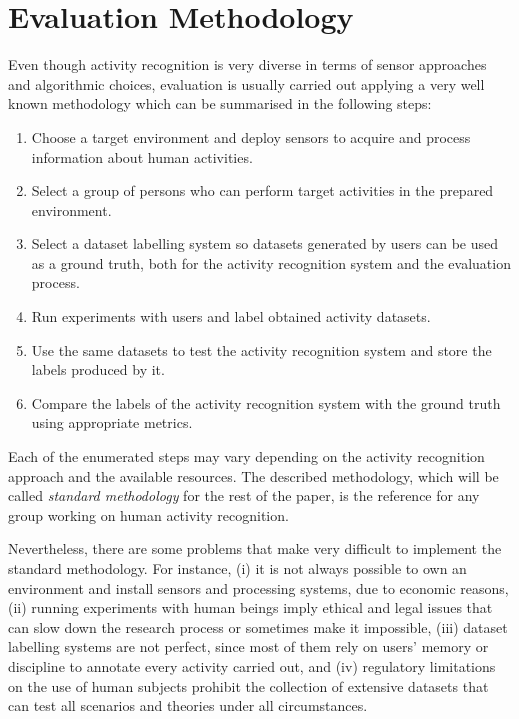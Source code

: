 \section{Evaluation Methodology}
\label{sec:evaluation:methodology}

Even though activity recognition is very diverse in terms of sensor approaches and algorithmic choices, evaluation is usually carried out applying a very well known methodology which can be summarised in the following steps:

\begin{enumerate}
 \item Choose a target environment and deploy sensors to acquire and process information about human activities. 
 \item Select a group of persons who can perform target activities in the prepared environment.
 \item Select a dataset labelling system so datasets generated by users can be used as a ground truth, both for the activity recognition system and the evaluation process.
 \item Run experiments with users and label obtained activity datasets.
 \item Use the same datasets to test the activity recognition system and store the labels produced by it.
 \item Compare the labels of the activity recognition system with the ground truth using appropriate metrics.
\end{enumerate}


Each of the enumerated steps may vary depending on the activity recognition approach and the available resources. The described methodology, which will be called \textit{standard methodology} for the rest of the paper, is the reference for any group working on human activity recognition.

Nevertheless, there are some problems that make very difficult to implement the standard methodology. For instance, (i) it is not always possible to own an environment and install sensors and processing systems, due to economic reasons, (ii) running experiments with human beings imply ethical and legal issues that can slow down the research process or sometimes make it impossible, (iii) dataset labelling systems are not perfect, since most of them rely on users' memory or discipline to annotate every activity carried out, and (iv) regulatory limitations on the use of human subjects prohibit the collection of extensive datasets that can test all scenarios and theories under all circumstances. 

